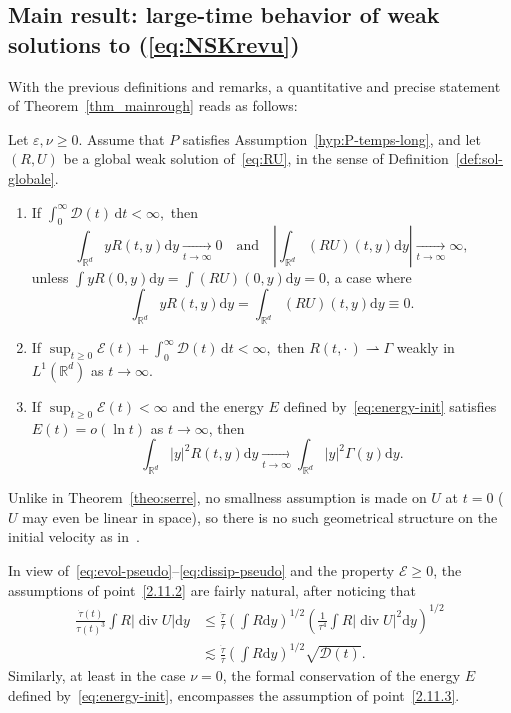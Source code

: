 \documentclass[AHL,Unicode,longabstracts]{cedram}
\DeclareMathOperator{\DIV}{div}
\newcommand*\R{\mathbb{R}}
\newcommand*\dd {\mathrm{d}}
\newcommand*\<{\left\langle}
\renewcommand*\>{\right\rangle}
\renewcommand*\le{\leqslant}
\renewcommand*\ge{\geqslant}
\newcommand*\Tend[2]{\mathop{\longrightarrow}\limits_{#1\rightarrow#2}}
\newcommand*\eps{\varepsilon}
\begin{document}
\subsection{Main result: large-time behavior of weak solutions to (\ref{eq:NSKrevu})}

With the previous definitions and remarks, a quantitative and precise statement of Theorem~\ref{thm_mainrough} reads as follows:

\goodbreak
\begin{theo}\label{theo:temps-long}
Let $\eps,\nu\ge 0$. Assume that $P$ satisfies Assumption~\ref{hyp:P-temps-long}, and let $(R,U)$ be a global weak solution of~\eqref{eq:RU}, in the sense of Definition~\ref{def:sol-globale}.
\begin{enumerate}%
\item \label{2.11.1} If $\int_0^\infty \mathcal D(t) \, \dd t < \infty,$ then
\[
\int_{\R^d} yR(t,y)\dd y\Tend t \infty 0\quad \text{and}\quad \left|\int_{\R^d} (RU)(t,y)\dd y\right|\Tend t \infty \infty,
\]
unless $\int y R(0,y)\dd y= \int (RU)(0,y)\dd y =0$, a case where
\[
\int_{\R^d} yR(t,y)\dd y=\int_{\R^d} (RU)(t,y)\dd y\equiv 0.
\]

\item \label{2.11.2} If $
\sup_{t \ge 0} \mathcal E(t) + \int_0^\infty \mathcal D(t) \, \dd t < \infty,$ then $R(t, \cdot\,) \rightharpoonup \Gamma$ weakly in $L^1(\R^d)$ as $ t \to \infty$.

\item \label{2.11.3} If $
\sup_{t \ge 0} \mathcal E(t) < \infty$ and the energy $E$ defined by~\eqref{eq:energy-init} satisfies $E(t)=o\left(\ln t\right)$ as $t\to \infty$, then
\begin{equation*}
\int_{\R^d}|y|^2R(t,y) \dd y \Tend t \infty \int_{\R^d}|y|^2 \Gamma(y) \dd y.
\end{equation*}
\end{enumerate}
\end{theo}

\begin{rema}
Unlike in Theorem~\ref{theo:serre}, no smallness assumption is made on $U$ at $t=0$ ($U$ may even be linear in space), so there is no such geometrical structure on the initial velocity as in~\cite{Serre97,Gra98}.
\end{rema}

\begin{rema}\label{rem:hyp-naturelles}
In view of~\eqref{eq:evol-pseudo}--\eqref{eq:dissip-pseudo} and the property $\mathcal E\ge 0$, the assumptions of point~\eqref{2.11.2} are fairly natural, after noticing that
\begin{align*}
\frac{\dot
\tau(t)}{\tau(t)^3} \int R \left| \DIV U\right|\dd y & \le
\frac{\dot \tau}{\tau}\left(\int R\dd y\right)^{1/2} \left(\frac{1}{\tau^4}\int R|\DIV U|^2\dd y\right)^{1/2}\\
&\lesssim \frac{\dot \tau}{\tau}\left(\int R\dd y\right)^{1/2} \sqrt{\mathcal D(t)}.
\end{align*}
Similarly, at least in the case $\nu=0$, the formal conservation of the energy $E$ defined by~\eqref{eq:energy-init}, encompasses the assumption of point~\eqref{2.11.3}.
\end{rema}
\end{document}
